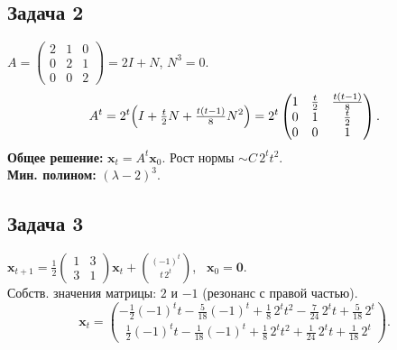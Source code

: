 \documentclass[12pt]{article}
\begin{document}
\subsection*{Задача 2}
$A=\begin{pmatrix}2&1&0\\0&2&1\\0&0&2\end{pmatrix}=2I+N$, $N^3=0$. \\
\[
A^t=2^t\Bigl(I+\tfrac{t}{2}N+\tfrac{t(t-1)}{8}N^2\Bigr)
=
2^t\begin{pmatrix}
1&\tfrac{t}{2}&\tfrac{t(t-1)}{8}\\
0&1&\tfrac{t}{2}\\
0&0&1
\end{pmatrix}.
\]
\textbf{Общее решение: } $\mathbf x_t=A^t\mathbf x_0$. Рост нормы $\sim C\,2^t t^2$. \\
\textbf{Мин. полином: } $(\lambda-2)^3$.

\subsection*{Задача 3}
$\mathbf x_{t+1}=\tfrac12\!\begin{pmatrix}1&3\\3&1\end{pmatrix}\mathbf x_t+\binom{(-1)^t}{t\,2^t}$, \ $\mathbf x_0=\mathbf 0$. \\
Собств. значения матрицы: $2$ и $-1$ (резонанс с правой частью). \\
\[
\mathbf x_t=\binom{-\frac12(-1)^t t-\frac{5}{18}(-1)^t+\frac18\,2^t t^2-\frac{7}{24}\,2^t t+\frac{5}{18}\,2^t}{
\ \ \frac12(-1)^t t-\frac{1}{18}(-1)^t+\frac18\,2^t t^2+\frac{1}{24}\,2^t t+\frac{1}{18}\,2^t\ }.
\]
\end{document}
